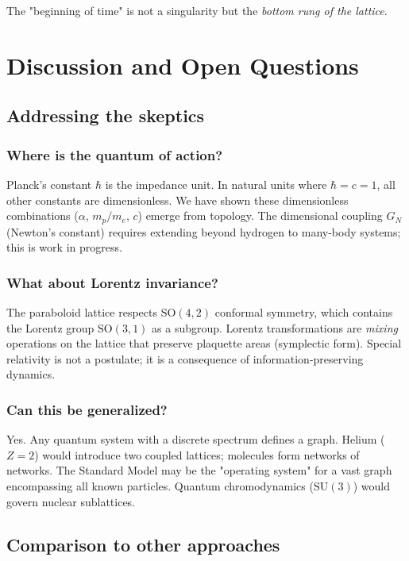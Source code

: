 \documentclass[aps,prd,twocolumn,superscriptaddress,groupedaddress,showpacs]{revtex4-2}
\newcommand{\SO}{\ensuremath{\text{SO}}}
\newcommand{\SU}{\ensuremath{\text{SU}}}
\begin{document}
The "beginning of time" is not a singularity but the \emph{bottom rung of the lattice}.

\section{Discussion and Open Questions}

\subsection{Addressing the skeptics}

\subsubsection{Where is the quantum of action?}

Planck's constant $\hbar$ is the impedance unit. In natural units where $\hbar = c = 1$, all other constants are dimensionless. We have shown these dimensionless combinations ($\alpha$, $m_p/m_e$, $c$) emerge from topology. The dimensional coupling $G_N$ (Newton's constant) requires extending beyond hydrogen to many-body systems; this is work in progress.

\subsubsection{What about Lorentz invariance?}

The paraboloid lattice respects $\SO(4,2)$ conformal symmetry, which contains the Lorentz group $\SO(3,1)$ as a subgroup. Lorentz transformations are \emph{mixing} operations on the lattice that preserve plaquette areas (symplectic form). Special relativity is not a postulate; it is a consequence of information-preserving dynamics.

\subsubsection{Can this be generalized?}

Yes. Any quantum system with a discrete spectrum defines a graph. Helium ($Z=2$) would introduce two coupled lattices; molecules form networks of networks. The Standard Model may be the "operating system" for a vast graph encompassing all known particles. Quantum chromodynamics ($\SU(3)$) would govern nuclear sublattices.

\subsection{Comparison to other approaches}
\end{document}
